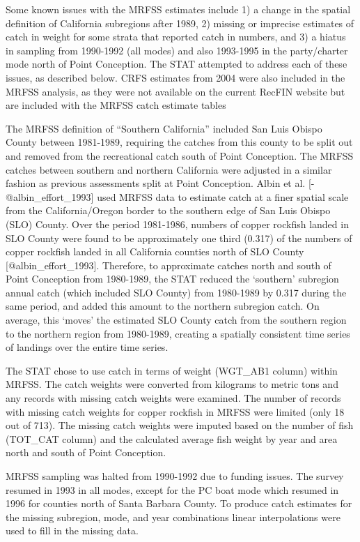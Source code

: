 \documentclass[
]{article}
\begin{document}
Some known issues with the MRFSS estimates include 1) a change in the
spatial definition of California subregions after 1989, 2) missing or
imprecise estimates of catch in weight for some strata that reported
catch in numbers, and 3) a hiatus in sampling from 1990-1992 (all modes)
and also 1993-1995 in the party/charter mode north of Point Conception.
The STAT attempted to address each of these issues, as described below.
CRFS estimates from 2004 were also included in the MRFSS analysis, as
they were not available on the current RecFIN website but are included
with the MRFSS catch estimate tables

The MRFSS definition of ``Southern California'' included San Luis Obispo
County between 1981-1989, requiring the catches from this county to be
split out and removed from the recreational catch south of Point
Conception. The MRFSS catches between southern and northern California
were adjusted in a similar fashion as previous assessments split at
Point Conception. Albin et al. {[}-@albin\_effort\_1993{]} used MRFSS
data to estimate catch at a finer spatial scale from the
California/Oregon border to the southern edge of San Luis Obispo (SLO)
County. Over the period 1981-1986, numbers of copper rockfish landed in
SLO County were found to be approximately one third (0.317) of the
numbers of copper rockfish landed in all California counties north of
SLO County {[}@albin\_effort\_1993{]}. Therefore, to approximate catches
north and south of Point Conception from 1980-1989, the STAT reduced the
`southern' subregion annual catch (which included SLO County) from
1980-1989 by 0.317 during the same period, and added this amount to the
northern subregion catch. On average, this `moves' the estimated SLO
County catch from the southern region to the northern region from
1980-1989, creating a spatially consistent time series of landings over
the entire time series.

The STAT chose to use catch in terms of weight (WGT\_AB1 column) within
MRFSS. The catch weights were converted from kilograms to metric tons
and any records with missing catch weights were examined. The number of
records with missing catch weights for copper rockfish in MRFSS were
limited (only 18 out of 713). The missing catch weights were imputed
based on the number of fish (TOT\_CAT column) and the calculated average
fish weight by year and area north and south of Point Conception.

MRFSS sampling was halted from 1990-1992 due to funding issues. The
survey resumed in 1993 in all modes, except for the PC boat mode which
resumed in 1996 for counties north of Santa Barbara County. To produce
catch estimates for the missing subregion, mode, and year combinations
linear interpolations were used to fill in the missing data.
\end{document}
